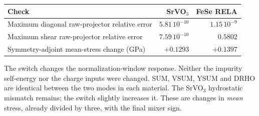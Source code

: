 \begin{center}
\begin{tabular}{lrr}\toprule
Check & SrVO$_3$ & FeSe RELA\\\midrule
Maximum diagonal raw-projector relative error & $5.81\,10^{-10}$ & $1.15\,10^{-9}$\\
Maximum shear raw-projector relative error & $7.59\,10^{-10}$ & $0.5802$\\
Symmetry-adjoint mean-stress change (GPa) & $+0.1293$ & $+0.1397$\\\bottomrule
\end{tabular}
\end{center}
The switch changes the normalization-window response. Neither the impurity
self-energy nor the charge inputs were changed. SUM, VSUM, YSUM and DRHO are
identical between the two modes in each material. The SrVO$_3$ hydrostatic
mismatch remains; the switch slightly increases it. These are changes in
\emph{mean} stress, already divided by three, with the final mixer sign.
